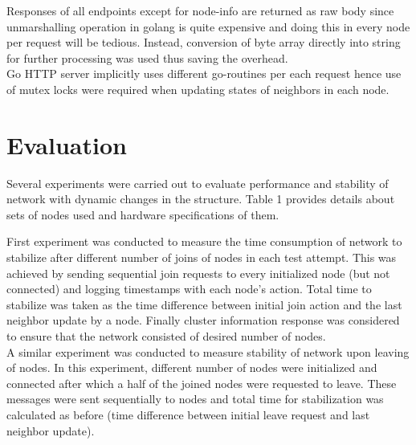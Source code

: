 \documentclass[
    a4paper,
    twocolumn,
]{article}
\begin{document}
Responses of all endpoints except for node-info are returned as raw body since unmarshalling operation in golang is quite expensive and doing this in every node per request will be tedious. Instead, conversion of byte array directly into string for further processing was used thus saving the overhead. \\

Go HTTP server implicitly uses different go-routines per each request hence use of mutex locks were required when updating states of neighbors in each node.

\section{Evaluation}

Several experiments were carried out to evaluate performance and stability of network with dynamic changes in the structure. Table 1 provides details about sets of nodes used and hardware specifications of them.

\begin{table}[!ht]
	\renewcommand{\arraystretch}{1.4}
	\centering
	\caption{Hardware specification of nodes}
\end{table}

First experiment was conducted to measure the time consumption of network to stabilize after different number of joins of nodes in each test attempt. This was achieved by sending sequential join requests to every initialized node (but not connected) and logging timestamps with each node's action. Total time to stabilize was taken as the time difference between initial join action and the last neighbor update by a node. Finally cluster information response was considered to ensure that the network consisted of desired number of nodes.\\

A similar experiment was conducted to measure stability of network upon leaving of nodes. In this experiment, different number of nodes were initialized and connected after which a half of the joined nodes were requested to leave. These messages were sent sequentially to nodes and total time for stabilization was calculated as before (time difference between initial leave request and last neighbor update).\\
\end{document}
